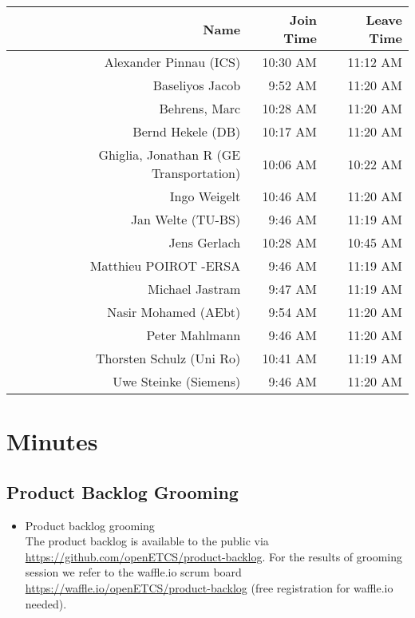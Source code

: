 \documentclass[a4paper, 11pt]{article}
\begin{document}
\begin{table}[htbp]
    \begin{tabular}{rrr}
    \toprule
    \textbf{Name} & \textbf{Join Time} & \textbf{Leave Time} \\
    \midrule
    Alexander Pinnau (ICS) & 10:30 AM & 11:12 AM \\
    Baseliyos Jacob & 9:52 AM & 11:20 AM \\
    Behrens, Marc & 10:28 AM & 11:20 AM \\
    Bernd Hekele (DB) & 10:17 AM & 11:20 AM \\
    Ghiglia, Jonathan R (GE Transportation) & 10:06 AM & 10:22 AM \\
    Ingo Weigelt & 10:46 AM & 11:20 AM \\
    Jan Welte (TU-BS) & 9:46 AM & 11:19 AM \\
    Jens Gerlach & 10:28 AM & 10:45 AM \\
    Matthieu POIROT -ERSA & 9:46 AM & 11:19 AM \\
    Michael Jastram & 9:47 AM & 11:19 AM \\
    Nasir Mohamed (AEbt) & 9:54 AM & 11:20 AM \\
    Peter Mahlmann & 9:46 AM & 11:20 AM \\
    Thorsten Schulz (Uni Ro) & 10:41 AM & 11:19 AM \\
    Uwe Steinke (Siemens) & 9:46 AM & 11:20 AM \\
    \bottomrule
    \end{tabular}%
  \label{tab:addlabel}%
\end{table}%






\section{Minutes}

\subsection{Product Backlog Grooming}
\begin{itemize}
\item Product backlog grooming\\
The product backlog is available to the public via 
\url{https://github.com/openETCS/product-backlog}. For the results of grooming session we refer to the waffle.io scrum board \url{https://waffle.io/openETCS/product-backlog} (free registration for waffle.io needed).
\end{itemize}
\end{document}
